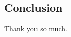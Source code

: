 \documentclass[letterpaper, 11pt]{article}
\title{\deliv{\srs}{Interview}}
\date{\datesrs}
\begin{document}
\maketitle
\tableofcontents
\thispagestyle{fancy}

\begin{flushleft}







\section{Conclusion}

Thank you so much.


\end{flushleft}
\end{document}
